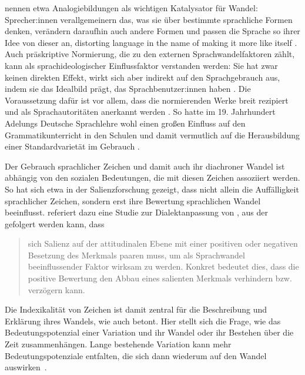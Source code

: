 \citet[]{Woolard1994} nennen etwa Analogiebildungen als wichtigen Katalysator für Wandel: Sprecher:innen verallgemeinern das, was sie über bestimmte sprachliche Formen denken, verändern daraufhin auch andere Formen und passen die Sprache so ihrer Idee von dieser an, \glqq distorting language in the name of making it more like itself\grqq{} \citep[70]{Woolard1994}. %
Auch präskriptive Normierung, die \citet[11]{Banhold2015} zu den externen Sprachwandelfaktoren zählt, kann als sprachideologischer Einflussfaktor verstanden werden: 
Sie hat zwar keinen direkten Effekt, wirkt sich aber indirekt auf den Sprachgebrauch aus, indem sie das Idealbild prägt, das Sprachbenutzer:innen haben \citep[s.][69]{Woolard1994}.
Die Voraussetzung dafür ist vor allem, dass die normierenden Werke breit rezipiert und als Sprachautoritäten anerkannt werden \citep[s.][4]{Elspa.2005}.
So hatte im 19. Jahrhundert Adelungs \glqq Deutsche Sprachlehre\grqq{} wohl einen großen Einfluss auf den Grammatikunterricht in den Schulen und damit vermutlich auf die Herausbildung einer Standardvarietät im Gebrauch \citep[s.][5]{Elspa.2005}.

Der Gebrauch sprachlicher Zeichen und damit auch ihr diachroner Wandel ist abh{\"a}ngig von den sozialen Bedeutungen, die mit diesen Zeichen assoziiert werden.
So hat sich etwa in der Salienzforschung gezeigt, dass nicht allein die Auffälligkeit sprachlicher Zeichen, sondern erst ihre Bewertung sprachlichen Wandel beeinflusst. 
\citet[94]{Lenz2010} referiert dazu eine Studie zur Dialektanpassung von \citet{Auer.1996}, aus der gefolgert werden kann, dass \begin{quote} sich Salienz auf der attitudinalen Ebene mit einer positiven oder negativen Besetzung des Merkmals paaren muss, um als Sprachwandel beeinflussender Faktor wirksam zu werden. 
Konkret bedeutet dies, dass die positive Bewertung den Abbau eines salienten Merkmals verhindern bzw. verz{\"o}gern kann.~\citep[94]{Lenz2010} \end{quote}
Die Indexikalit{\"a}t von Zeichen ist damit zentral f{\"u}r die Beschreibung und Erkl{\"a}rung ihres Wandels, wie auch \citet[132]{Gal.2016} betont.
Hier stellt sich die Frage, wie das Bedeutungspotenzial einer Variation und ihr Wandel oder ihr Bestehen {\"u}ber die Zeit zusammenh{\"a}ngen. 
Lange bestehende Variation kann mehr Bedeutungspotenziale entfalten, die sich dann wiederum auf den Wandel auswirken~\citep[s.][82]{Eckert.2016}.

